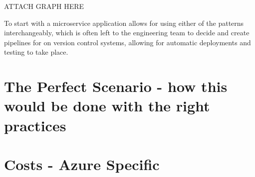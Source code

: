 ATTACH GRAPH HERE

To start with a microservice application allows for using either of the patterns interchangeably, which is often left to the engineering team to decide and create pipelines for on version control systems, allowing for automatic deployments and testing to take place.  


 \section{The Perfect Scenario - how this would be done with the right practices}
\section{Costs - Azure Specific}
